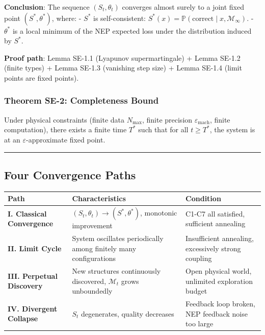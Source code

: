 \documentclass[
  12pt,
]{article}
\begin{document}
\textbf{Conclusion}: The sequence $(S_t, \theta_t)$ converges almost surely to a joint fixed point $(S^*, \theta^*)$, where:
- $S^*$ is self-consistent: $S^*(x) = \mathbb{P}(\text{correct} \mid x, \mathcal{M}_\infty)$.
- $\theta^*$ is a local minimum of the NEP expected loss under the distribution induced by $S^*$.

\textbf{Proof path}: Lemma SE-1.1 (Lyapunov supermartingale) + Lemma SE-1.2 (finite types) + Lemma SE-1.3 (vanishing step size) + Lemma SE-1.4 (limit points are fixed points).

\subsubsection{Theorem SE-2: Completeness Bound}\label{theorem-se-2-completeness-bound}

Under physical constraints (finite data $N_{\max}$, finite precision $\varepsilon_{\text{mach}}$, finite computation), there exists a finite time $T^*$ such that for all $t \geq T^*$, the system is at an $\varepsilon$-approximate fixed point.

\begin{center}\rule{0.5\linewidth}{0.5pt}\end{center}

\subsection{Four Convergence Paths}\label{four-convergence-paths}

\begin{longtable}[]{@{}
  >{\raggedright\arraybackslash}p{}
  >{\raggedright\arraybackslash}p{}
  >{\raggedright\arraybackslash}p{}@{}}
\toprule\noalign{}
\begin{minipage}[b]{\linewidth}\raggedright
Path
\end{minipage} & \begin{minipage}[b]{\linewidth}\raggedright
Characteristics
\end{minipage} & \begin{minipage}[b]{\linewidth}\raggedright
Condition
\end{minipage} \\
\midrule\noalign{}
\endhead
\bottomrule\noalign{}
\endlastfoot
\textbf{I. Classical Convergence} & $(S_t, \theta_t) \to (S^*, \theta^*)$, monotonic improvement & C1-C7 all satisfied, sufficient annealing \\
\textbf{II. Limit Cycle} & System oscillates periodically among finitely many configurations & Insufficient annealing, excessively strong coupling \\
\textbf{III. Perpetual Discovery} & New structures continuously discovered, $\mathcal{M}_t$ grows unboundedly & Open physical world, unlimited exploration budget \\
\textbf{IV. Divergent Collapse} & $S_t$ degenerates, quality decreases & Feedback loop broken, NEP feedback noise too large \\
\end{longtable}
\end{document}
